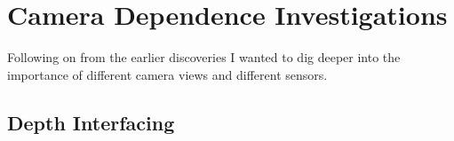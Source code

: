 \section{Camera Dependence Investigations}
Following on from the earlier discoveries I wanted to dig deeper into the importance of different camera views and different sensors.

\subsection{Depth Interfacing} 